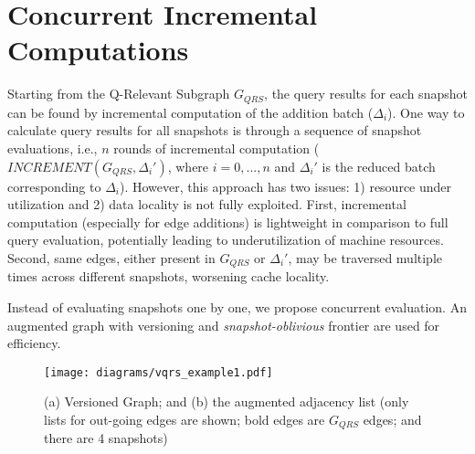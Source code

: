 \section{Concurrent Incremental Computations}
Starting from the Q-Relevant Subgraph $G_{QRS}$, the query results for each snapshot can be found by incremental computation of the addition batch ($\Delta_i$).
One way to calculate query results for all snapshots is through a sequence of snapshot evaluations, i.e., $n$ rounds of incremental computation ($INCREMENT(G_{QRS},\Delta_i')$, where $i=0,...,n$ and $\Delta_i'$ is the reduced batch corresponding to $\Delta_i$). 
However, this approach has two issues: 1) resource under utilization and 2) data locality is not fully exploited.
First, incremental computation (especially for edge additions) is lightweight in comparison to full query evaluation, potentially leading to underutilization of machine resources. 
Second, same edges, either present in $G_{QRS}$ or $\Delta_i'$,  may be traversed multiple times across different snapshots, worsening cache locality.

Instead of evaluating snapshots one by one, we propose concurrent evaluation. An augmented graph with versioning and \textit{snapshot-oblivious} frontier are used for efficiency.

\begin{figure}[!t]
    \centering
    \texttt{[image: diagrams/vqrs\_example1.pdf]}
    \vspace{-0.175in}
    \caption{(a) Versioned Graph; and (b) the augmented adjacency list (only lists for out-going edges are shown; bold edges are $G_{QRS}$ edges; and there are 4 snapshots)}
    \label{fig:vg_example}
    \vspace{-0.25in}
\end{figure}

        
